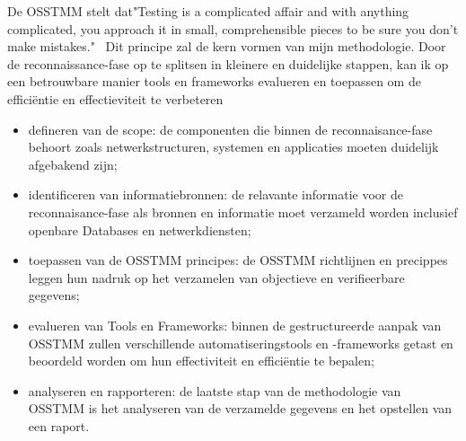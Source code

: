 De OSSTMM stelt dat"Testing is a complicated affair and with anything complicated, you approach it in small, comprehensible pieces to be sure you don’t make mistakes."~\autocite{Herzog}
Dit principe zal de kern vormen van mijn methodologie. 
Door de reconnaissance-fase op te splitsen in kleinere en duidelijke stappen, kan ik op een betrouwbare manier tools en frameworks evalueren en toepassen om de efficiëntie en effectieviteit te verbeteren

\begin{itemize}
    \item defineren van de scope: 
    de componenten die binnen de reconnaisance-fase behoort zoals netwerkstructuren, systemen en applicaties moeten duidelijk afgebakend zijn;
    \item identificeren van informatiebronnen:
    de relavante informatie voor de reconnaisance-fase als bronnen en informatie moet verzameld worden inclusief openbare Databases en netwerkdiensten; 
    \item toepassen van de OSSTMM principes:
    de OSSTMM richtlijnen en precippes leggen hun nadruk op het verzamelen van objectieve en verifieerbare gegevens;
    \item evalueren van Tools en Frameworks:
    binnen de gestructureerde aanpak van OSSTMM zullen verschillende automatiseringstools en -frameworks getast en beoordeld worden om hun effectiviteit en efficiëntie te bepalen;
    \item analyseren en rapporteren:
    de laatste stap van de methodologie van OSSTMM is het analyseren van de verzamelde gegevens en het opstellen van een raport.
\end{itemize}



